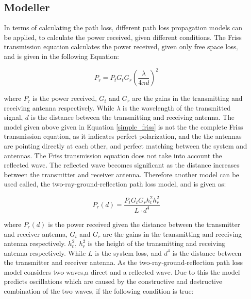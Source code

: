 \subsection{Modeller}

In terms of calculating the path loss, different path loss propagation models can be applied, to calculate the power received, given different conditions. The Friss transmission equation calculates the power received, given only free space loss, and is given in the following Equation:

\begin{equation}
P_r = P_t G_t G_r (\frac{\lambda}{4 \pi d})^2
\label{simple_friss}
\end{equation}

where $P_{r}$ is the power received, $G_t$ and $G_r$ are the gains in the transmitting and receiving antenna respectively. While $\lambda$ is the wavelength of the transmitted signal, $d$ is the distance between the transmitting and receiving antenna. The model given above given in Equation \ref{simple_friss} is not the the complete Friss transmission equation, as it indicates perfect polarization, and the the antennas are pointing directly at each other, and perfect matching between the system and antennas. The Friss transmission equation does not take into account the reflected wave. The reflected wave becomes significant as the distance increases between the transmitter and receiver antenna. Therefore another model can be used called, the two-ray-ground-reflection path loss model, and is given as:

\begin{equation}
P_r(d) = \frac{P_t G_t G_r h^2_t h^2_r}{L \cdot d^4}
\label{two_ray_model}
\end{equation}

where $P_r(d)$ is the power received given the distance between the transmitter and receiver antenna, $G_t$ and $G_r$ are the gains in the transmitting and receiving antenna respectively. $h^2_t$, $h^2_r$ is the height of the transmitting and receiving antenna respectively.  While $L$ is the system loss, and $d^{4}$ is the distance between the transmitter and receiver antenna. As the two-ray-ground-reflection path loss model considers two waves,a direct and a reflected wave. Due to this the model predicts  oscillations which are caused by the constructive and destructive combination of the two waves, if the following condition is true:




